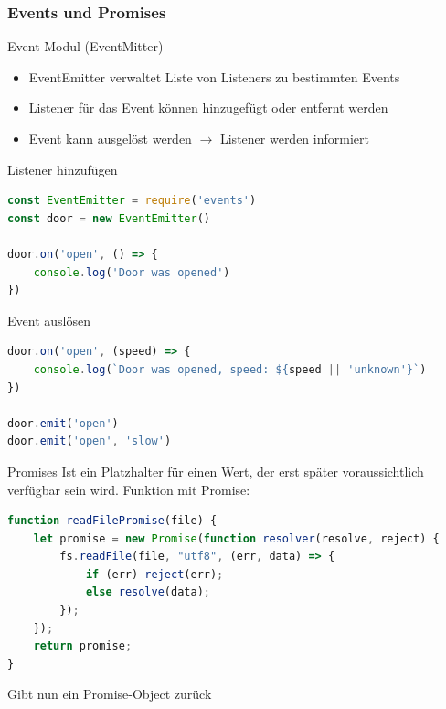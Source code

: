 \subsubsection{Events und Promises}

\begin{definition}{Event-Modul (EventMitter)}
\begin{itemize}
  \item EventEmitter verwaltet Liste von Listeners zu bestimmten Events
  \item Listener für das Event können hinzugefügt oder entfernt werden
  \item Event kann ausgelöst werden $\rightarrow$ Listener werden informiert
\end{itemize}
\end{definition}

\begin{examplecode}{Listener hinzufügen}
\begin{lstlisting}[language=JavaScript, style=basesmol]
const EventEmitter = require('events')
const door = new EventEmitter()

door.on('open', () => {
    console.log('Door was opened')
})
\end{lstlisting}
\end{examplecode}

\begin{examplecode}{Event auslösen}
\begin{lstlisting}[language=JavaScript, style=basesmol]
door.on('open', (speed) => {
    console.log(`Door was opened, speed: ${speed || 'unknown'}`)
})

door.emit('open')
door.emit('open', 'slow')
\end{lstlisting}
\end{examplecode}

\begin{definition}{Promises}
Ist ein Platzhalter für einen Wert, der erst später voraussichtlich verfügbar sein wird.
Funktion mit Promise:
\begin{lstlisting}[language=JavaScript, style=basesmol]
function readFilePromise(file) {
    let promise = new Promise(function resolver(resolve, reject) {
        fs.readFile(file, "utf8", (err, data) => {
            if (err) reject(err);
            else resolve(data);
        });
    });
    return promise;
}
\end{lstlisting}
Gibt nun ein Promise-Object zurück
\end{definition}

